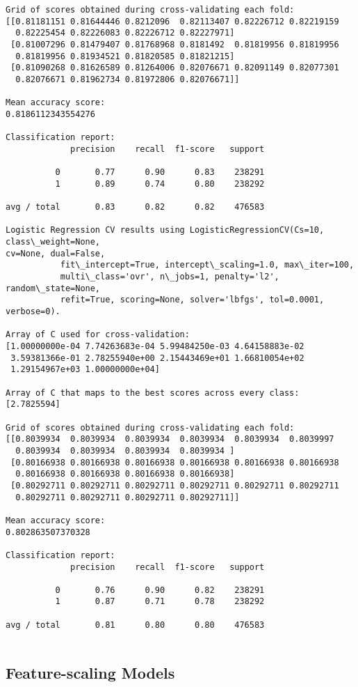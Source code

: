 \documentclass[11pt]{article}
\begin{document}
\begin{Verbatim}[commandchars=\\\{\},fontsize=\footnotesize]
Grid of scores obtained during cross-validating each fold:
[[0.81181151 0.81644446 0.8212096  0.82113407 0.82226712 0.82219159
  0.82225454 0.82226083 0.82226712 0.82227971]
 [0.81007296 0.81479407 0.81768968 0.8181492  0.81819956 0.81819956
  0.81819956 0.81934521 0.81820585 0.81821215]
 [0.81090268 0.81626589 0.81264006 0.82076671 0.82091149 0.82077301
  0.82076671 0.81962734 0.81972806 0.82076671]]

Mean accuracy score:
0.8186112343554276

Classification report:
             precision    recall  f1-score   support

          0       0.77      0.90      0.83    238291
          1       0.89      0.74      0.80    238292

avg / total       0.83      0.82      0.82    476583

Logistic Regression CV results using LogisticRegressionCV(Cs=10, class\_weight=None,
cv=None, dual=False,
           fit\_intercept=True, intercept\_scaling=1.0, max\_iter=100,
           multi\_class='ovr', n\_jobs=1, penalty='l2', random\_state=None,
           refit=True, scoring=None, solver='lbfgs', tol=0.0001, verbose=0).

Array of C used for cross-validation:
[1.00000000e-04 7.74263683e-04 5.99484250e-03 4.64158883e-02
 3.59381366e-01 2.78255940e+00 2.15443469e+01 1.66810054e+02
 1.29154967e+03 1.00000000e+04]

Array of C that maps to the best scores across every class:
[2.7825594]

Grid of scores obtained during cross-validating each fold:
[[0.8039934  0.8039934  0.8039934  0.8039934  0.8039934  0.8039997
  0.8039934  0.8039934  0.8039934  0.8039934 ]
 [0.80166938 0.80166938 0.80166938 0.80166938 0.80166938 0.80166938
  0.80166938 0.80166938 0.80166938 0.80166938]
 [0.80292711 0.80292711 0.80292711 0.80292711 0.80292711 0.80292711
  0.80292711 0.80292711 0.80292711 0.80292711]]

Mean accuracy score:
0.802863507370328

Classification report:
             precision    recall  f1-score   support

          0       0.76      0.90      0.82    238291
          1       0.87      0.71      0.78    238292

avg / total       0.81      0.80      0.80    476583


    \end{Verbatim}
\newpage
    \subsection{Feature-scaling Models}
\end{document}
